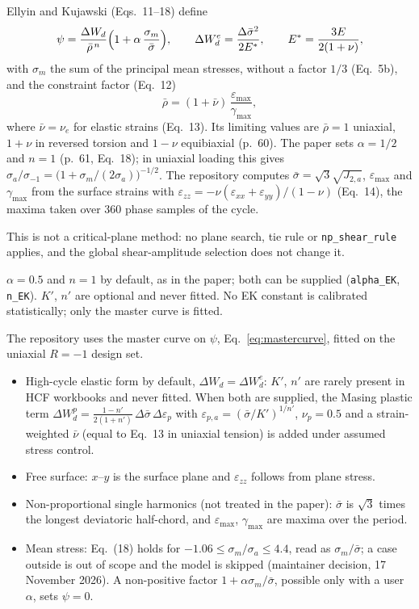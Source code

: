  Ellyin and Kujawski (Eqs.~11--18) define
\begin{equation}
\psi = \frac{\Delta W_d}{\bar\rho^{\,n}}\Bigl(1+\alpha\,\frac{\sigma_m}{\bar\sigma}\Bigr),\qquad
\Delta W_d^e = \frac{\Delta\bar\sigma^2}{2E^*},\qquad E^* = \frac{3E}{2(1+\nu)} ,
\label{eq:ek-main}
\end{equation}
with $\sigma_m$ the sum of the principal mean stresses, without a factor $1/3$ (Eq.~5b), and the
constraint factor (Eq.~12)
\begin{equation}
\bar\rho = (1+\bar\nu)\,\frac{\varepsilon_{\max}}{\gamma_{\max}} ,
\label{eq:ek-rho}
\end{equation}
where $\bar\nu=\nu_e$ for elastic strains (Eq.~13). Its limiting values are $\bar\rho=1$ uniaxial,
$1+\nu$ in reversed torsion and $1-\nu$ equibiaxial (p.~60). The paper sets $\alpha=1/2$ and $n=1$
(p.~61, Eq.~18); in uniaxial loading this gives
$\sigma_a/\sigma_{-1}=\bigl(1+\sigma_m/(2\sigma_a)\bigr)^{-1/2}$. The repository computes
$\bar\sigma=\sqrt3\sqrt{J_{2,a}}$, $\varepsilon_{\max}$ and $\gamma_{\max}$ from the surface strains
with $\varepsilon_{zz}=-\nu(\varepsilon_{xx}+\varepsilon_{yy})/(1-\nu)$ (Eq.~14), the maxima taken
over 360 phase samples of the cycle.

This is not a critical-plane method: no plane search, tie rule or \texttt{np\_shear\_rule}
applies, and the global shear-amplitude selection does not change it.

 $\alpha=0.5$ and $n=1$ by default, as in the paper; both can be
supplied (\texttt{alpha\_EK}, \texttt{n\_EK}). $K'$, $n'$ are optional and never fitted. No EK
constant is calibrated statistically; only the master curve is fitted.

 The repository uses the master curve on $\psi$, Eq.~\eqref{eq:mastercurve}, fitted on
the uniaxial $R=-1$ design set.

\begin{itemize}
\item High-cycle elastic form by default, $\Delta W_d=\Delta W_d^e$: $K'$, $n'$ are rarely present in
  HCF workbooks and never fitted. When both are supplied, the Masing plastic term
  $\Delta W_d^p=\frac{1-n'}{2(1+n')}\,\Delta\bar\sigma\,\Delta\varepsilon_p$ with
  $\varepsilon_{p,a}=(\bar\sigma/K')^{1/n'}$, $\nu_p=0.5$ and a strain-weighted $\bar\nu$ (equal to
  Eq.~13 in uniaxial tension) is added under assumed stress control.
\item Free surface: $x$--$y$ is the surface plane and $\varepsilon_{zz}$ follows from plane stress.
\item Non-proportional single harmonics (not treated in the paper): $\bar\sigma$ is $\sqrt3$ times
  the longest deviatoric half-chord, and $\varepsilon_{\max}$, $\gamma_{\max}$ are maxima over the
  period.
\item Mean stress: Eq.~(18) holds for $-1.06\le\sigma_m/\sigma_a\le4.4$, read as
  $\sigma_m/\bar\sigma$; a case outside is out of scope and the model is skipped (maintainer
  decision, 17 November 2026). A non-positive factor $1+\alpha\sigma_m/\bar\sigma$, possible only
  with a user $\alpha$, sets $\psi=0$.
\end{itemize}

